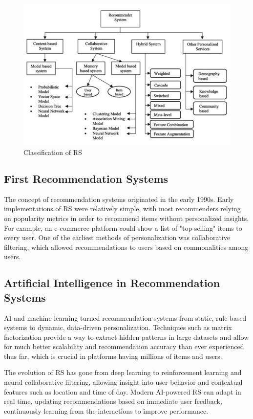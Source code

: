 \documentclass{article}
\begin{document}
\begin{figure}[!h]
    \centering
    \includegraphics[width=1\textwidth]{src/RS_classification.png}
    \caption{Classification of RS \cite{RS_AA_2}}
    \label{fig:RS-Classification}
\end{figure}
\subsection{First Recommendation Systems} 
The concept of recommendation systems originated in the early 1990s. Early implementations of RS were relatively simple, with most recommenders relying on popularity metrics in order to recommend items without personalized insights. For example, an e-commerce platform could show a list of "top-selling" items to every user. One of the earliest methods of personalization was collaborative filtering, which allowed recommendations to users based on commonalities among users.

\subsection{Artificial Intelligence in Recommendation Systems}

AI and machine learning turned recommendation systems from static, rule-based systems to dynamic, data-driven personalization. Techniques such as matrix factorization provide a way to extract hidden patterns in large datasets and allow for much better scalability and recommendation accuracy than ever experienced thus far, which is crucial in platforms having millions of items and users.

The evolution of RS has gone from deep learning to reinforcement learning and neural collaborative filtering, allowing insight into user behavior and contextual features such as location and time of day. Modern AI-powered RS can adapt in real time, updating recommendations based on immediate user feedback, continuously learning from the interactions to improve performance.\cite{AI_in_RS}
\end{document}
